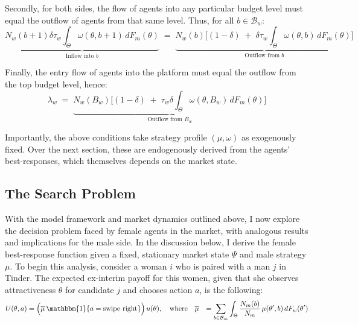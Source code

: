 Secondly, for both sides, the flow of agents into any particular budget level must equal the outflow of agents from that same level. Thus, for all $b\in\mathcal{B}_w$: 
\begin{equation}\label{eq:ss2} 
    \underbrace{N_w(b+1) \delta \tau_w \int_{\Theta} \omega(\theta,b+1)\,dF_{m}(\theta)}_{\text{Inflow into $b$}} \;=\; \underbrace{N_w(b) \Big[ (1-\delta) \;+\; \delta \tau_w\int_{\Theta} \omega(\theta,b)\,dF_{m}(\theta)\Big]}_{\text{Outflow from $b$}}
\end{equation}

Finally, the entry flow of agents into the platform must equal the outflow from the top budget level, hence: \begin{equation}\label{eq:ss3} 
    \lambda_w \;=\; \underbrace{N_w(B_w) \Big[ (1-\delta) \;+\; \tau_w \delta \int_{\Theta} \omega(\theta,B_w)\,dF_{m}(\theta) \Big]}_{\text{Outflow from $B_w$}}
\end{equation} 

Importantly, the above conditions take strategy profile $(\mu,\omega)$ as exogenously fixed. Over the next section, these are endogenously derived from the agents’ best-responses, which themselves depends on the market state.

\subsection{The Search Problem}\label{sec:section2.3}
With the model framework and market dynamics outlined above, I now explore the decision problem faced by female agents in the market, with analogous results and implications for the male side. In the discussion below, I derive the female best-response function given a fixed, stationary market state $\Psi$ and male strategy $\mu$. To begin this analysis, consider a woman $i$ who is paired with a man $j$ in Tinder. The expected ex-interim payoff for this women, given that she observes attractiveness $\theta$ for candidate $j$ and chooses action $a$, is the following: 
\begin{equation*}
    \begin{aligned}
        U(\theta, a)&=\Big(\overline{\mu}\,\mathbbm{1}\{a=\text{swipe right}\}\Big)\,u(\theta), \quad \text{where}\quad \overline{\mu} &= \sum_{b\in \mathcal{B}_m}\int_{\Theta}\frac{{N}_m(b)}{N_m}  \, \mu(\theta',b)\,dF_w(\theta')
    \end{aligned} 
\end{equation*}

